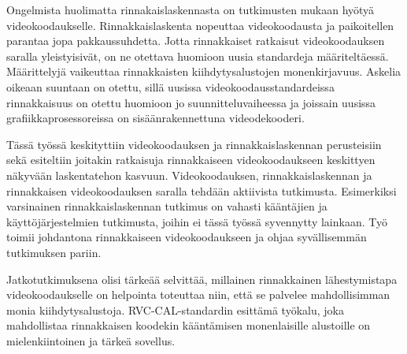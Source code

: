Ongelmista huolimatta rinnakaislaskennasta on tutkimusten mukaan hyötyä
videokoodaukselle. Rinnakkaislaskenta nopeuttaa videokoodausta ja paikoitellen
parantaa jopa pakkaussuhdetta. Jotta rinnakkaiset ratkaisut videokoodauksen
saralla yleistyisivät, on ne otettava huomioon uusia standardeja
määriteltäessä. Määrittelyjä vaikeuttaa rinnakkaisten kiihdytysalustojen
monenkirjavuus. Askelia oikeaan suuntaan on otettu, sillä uusissa
videokoodausstandardeissa rinnakkaisuus on otettu huomioon jo
suunnitteluvaiheessa ja joissain uusissa grafiikkaprosessoreissa on
sisäänrakennettuna videodekooderi.

Tässä työssä keskityttiin videokoodauksen ja rinnakkaislaskennan perusteisiin
sekä esiteltiin joitakin ratkaisuja rinnakkaiseen videokoodaukseen keskittyen
näkyvään laskentatehon kasvuun. Videokoodauksen, rinnakkaislaskennan ja
rinnakkaisen videokoodauksen saralla tehdään aktiivista tutkimusta. Esimerkiksi
varsinainen rinnakkaislaskennan tutkimus on vahasti kääntäjien ja
käyttöjärjestelmien tutkimusta, joihin ei tässä työssä syvennytty lainkaan.
Työ toimii johdantona rinnakkaiseen videokoodaukseen ja ohjaa syvällisemmän
tutkimuksen pariin.

Jatkotutkimuksena olisi tärkeää selvittää, millainen rinnakkainen
lähestymistapa videokoodaukselle on helpointa toteuttaa niin, että se
palvelee mahdollisimman monia kiihdytysalustoja. RVC-CAL-standardin esittämä
työkalu, joka mahdollistaa rinnakkaisen koodekin kääntämisen monenlaisille
alustoille on mielenkiintoinen ja tärkeä sovellus. 


